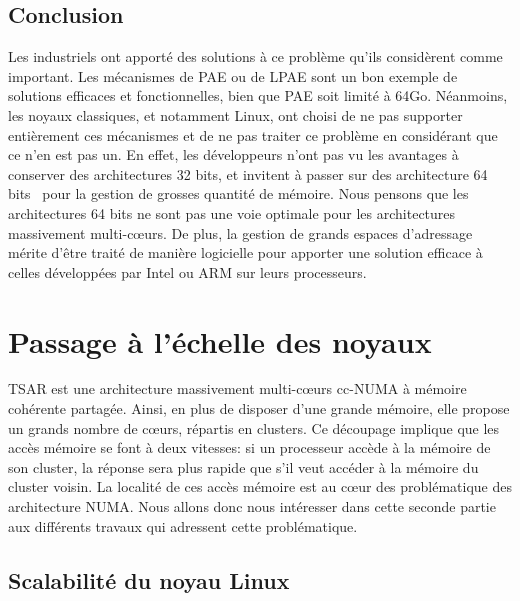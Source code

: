     \subsection{Conclusion}

      Les industriels ont apporté des solutions à ce problème qu'ils considèrent
      comme important. Les mécanismes de PAE ou de LPAE sont un bon exemple de
      solutions efficaces et fonctionnelles, bien que PAE soit limité à
      64Go. Néanmoins, les noyaux classiques, et notamment Linux, ont choisi de
      ne pas supporter entièrement ces mécanismes et de ne pas traiter ce
      problème en considérant que ce n'en est pas un. En effet, les développeurs
      n'ont pas vu les avantages à conserver des architectures 32 bits, et
      invitent à passer sur des architecture 64
      bits~\citep{gorman2004understanding} pour la gestion de grosses quantité
      de mémoire. Nous pensons que les architectures 64 bits ne sont pas une
      voie optimale pour les architectures massivement multi-c\oe urs. De plus,
      la gestion de grands espaces d'adressage mérite d'être traité de manière
      logicielle pour apporter une solution efficace à celles développées par
      Intel ou ARM sur leurs processeurs.

  
  \section{Passage à l’échelle des noyaux}
  \label{sec:scalability}

    TSAR est une architecture massivement multi-c\oe urs cc-NUMA à mémoire
    cohérente partagée. Ainsi, en plus de disposer d'une grande mémoire, elle
    propose un grands nombre de c\oe urs, répartis en clusters. Ce découpage
    implique que les accès mémoire se font à deux vitesses: si un processeur
    accède à la mémoire de son cluster, la réponse sera plus rapide que s'il
    veut accéder à la mémoire du cluster voisin. La localité de ces accès
    mémoire est au c\oe ur des problématique des architecture NUMA. Nous allons
    donc nous intéresser dans cette seconde partie aux différents travaux qui
    adressent cette problématique.


    \subsection{Scalabilité du noyau Linux}

